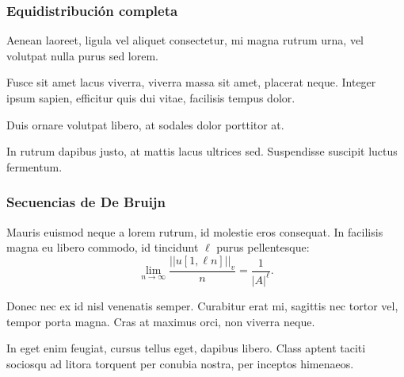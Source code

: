 \documentclass[t, 10pt, mathserif]{beamer}
\newcommand{\alocc}[2]{|\!|#1|\!|_{#2}}
\begin{document}
\begin{frame}
  \frametitle{Equidistribución completa}

  Aenean laoreet, ligula vel aliquet consectetur, mi magna rutrum urna, vel volutpat nulla purus sed lorem.
  \pause

  \medskip
  \begin{definition}
    Fusce sit amet lacus viverra, viverra massa sit amet, placerat neque. Integer ipsum sapien, efficitur quis dui vitae, facilisis tempus dolor.
    \pause

    Duis ornare volutpat libero, at sodales dolor porttitor at.
    \pause
  \end{definition}

  In rutrum dapibus justo, at mattis lacus ultrices sed. Suspendisse suscipit luctus fermentum.
\end{frame}



\begin{frame}
  \frametitle{Secuencias de De Bruijn}

  \medskip
  \begin{definition}
    Mauris euismod neque a lorem rutrum, id molestie eros consequat. In facilisis magna eu libero commodo, id tincidunt {\color{magenta} $\ell$} purus pellentesque:
    \begin{equation*}
      \lim_{n \rightarrow \infty} \frac{\alocc{u[1,\ell n]}{v}}{n} = \frac{1}{|A|^{\ell}}.  
    \end{equation*}
    \pause

    Donec nec ex id nisl venenatis semper. Curabitur erat mi, sagittis nec tortor vel, tempor porta magna. Cras at maximus orci, non viverra neque.
  \end{definition}
  \pause

  \medskip
  \begin{problem}
    In eget enim feugiat, cursus tellus eget, dapibus libero. Class aptent taciti sociosqu ad litora torquent per conubia nostra, per inceptos himenaeos.
  \end{problem}
\end{frame}

\end{document}
